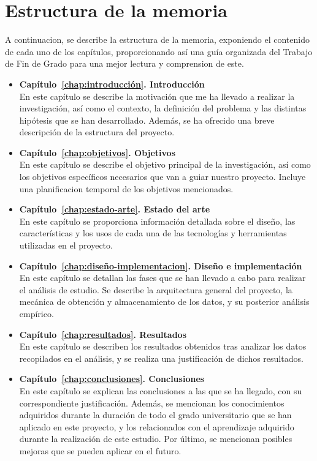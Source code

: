 \documentclass[a4paper, 12pt]{book}
\begin{document}
\section{Estructura de la memoria}
\label{sec:estructura}

A continuacion, se describe la estructura de la memoria, exponiendo el contenido de cada uno de los capítulos, proporcionando así
una guía organizada del Trabajo de Fin de Grado para una mejor lectura y comprension de este.

\begin{itemize}
  
  \item \textbf{Capítulo~\ref{chap:introducción}. Introducción}
  \\En este capítulo se describe la motivación que me ha llevado a realizar la investigación, así
  como el contexto, la definición del problema y las distintas hipótesis que se han desarrollado. Además, se ha ofrecido una breve descripción de la estructura del proyecto.

  \item \textbf{Capítulo~\ref{chap:objetivos}. Objetivos}
  \\En este capítulo se describe el objetivo principal de la investigación, así como los objetivos específicos necesarios
  que van a guiar nuestro proyecto. Incluye una planificacion temporal de los objetivos mencionados. 
  
  \item \textbf{Capítulo~\ref{chap:estado-arte}. Estado del arte}
  \\En este capítulo se proporciona información detallada sobre el diseño, las características y los usos de cada
  una de las tecnologías y herramientas utilizadas en el proyecto.  
  
  \item \textbf{Capítulo~\ref{chap:diseño-implementacion}. Diseño e implementación}
  \\En este capítulo se detallan las fases que se han llevado a cabo para realizar el análisis de estudio. 
  Se describe la arquitectura general del proyecto, la mecánica de obtención y almacenamiento de los datos, y su posterior análisis empírico.

  \item \textbf{Capítulo~\ref{chap:resultados}. Resultados}
  \\En este capítulo se describen los resultados obtenidos tras analizar los datos recopilados en el análisis, y se 
  realiza una justificación de dichos resultados.
 
  \item \textbf{Capítulo~\ref{chap:conclusiones}. Conclusiones}
  \\En este capítulo se explican las conclusiones a las que se ha llegado, con su correspondiente justificación.
  Además, se mencionan los conocimientos adquiridos durante la duración de todo el grado universitario que se han aplicado en este proyecto, y los relacionados con el aprendizaje
  adquirido durante la realización de este estudio. Por último, se mencionan posibles mejoras que se pueden aplicar en el futuro.

\end{itemize}
\end{document}
